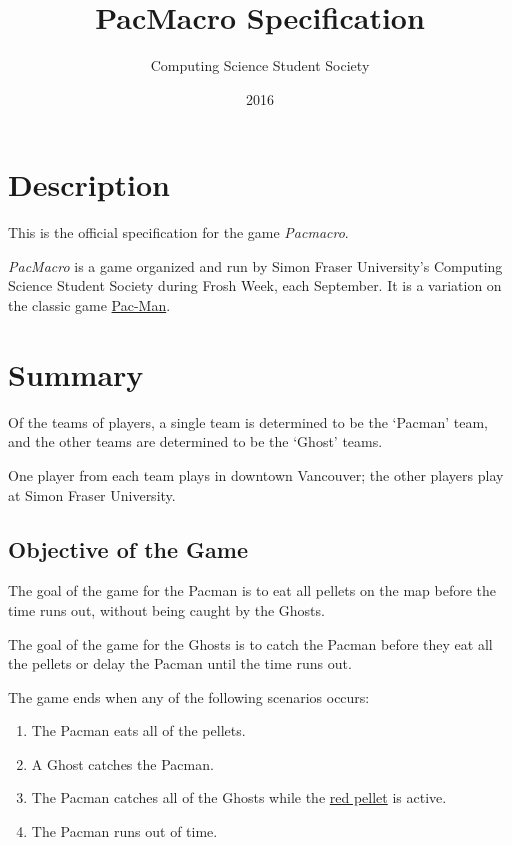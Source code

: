 \documentclass[10pt, oneside, letterpaper, titlepage]{article}
\title{PacMacro Specification}
\author{Computing Science Student Society}
\date{2016}
\begin{document}
	\maketitle
	\clearpage
	\tableofcontents
	\clearpage

	\section{Description}
	\label{sec:description}

	This is the official specification for the game \emph{Pacmacro}.

	\emph{PacMacro} is a game organized and run by Simon Fraser University's Computing Science Student Society during Frosh Week, each September. It is a variation on the classic game \href{https://en.wikipedia.org/wiki/Pac-Man}{Pac-Man}.

	\section{Summary}
	\label{sec:summary}

	Of the teams of players, a single team is determined to be the `Pacman' team, and the other teams are determined to be the `Ghost' teams.

	One player from each team plays in downtown Vancouver; the other players play at Simon Fraser University.

	\subsection{Objective of the Game}
	\label{subsec:summary:objective-of-the-game}

	The goal of the game for the Pacman is to eat all pellets on the map before the time runs out, without being caught by the Ghosts.

	The goal of the game for the Ghosts is to catch the Pacman before they eat all the pellets or delay the Pacman until the time runs out.

	The game ends when any of the following scenarios occurs:
	\begin{enumerate}
		\item The Pacman eats all of the pellets.
		\item A Ghost catches the Pacman.
		\item The Pacman catches all of the Ghosts while the \hyperref[subsec:gameplay:formal-rules]{red pellet} is active.
		\item The Pacman runs out of time.
	\end{enumerate}
\end{document}
